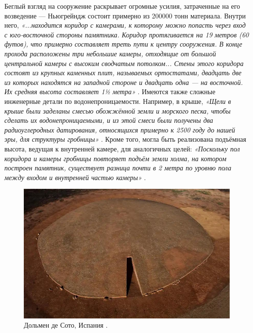 \documentclass[10pt,twocolumn,letterpaper]{article}
\begin{document}
Беглый взгляд на сооружение раскрывает огромные усилия, затраченные на его возведение — Ньюгрейндж состоит примерно из 200000 тонн материала. Внутри него, \textit{«...находится коридор с камерами, к которому можно попасть через вход с юго-восточной стороны памятника. Коридор протягивается на 19 метров (60 футов), что примерно составляет треть пути к центру сооружения. В конце прохода расположены три небольшие камеры, отходящие от большой центральной камеры с высоким сводчатым потолком... Стены этого коридора состоят из крупных каменных плит, называемых ортостатами, двадцать две из которых находятся на западной стороне и двадцать одна — на восточной. Их средняя высота составляет 1½ метра»} \cite{70}. Имеются также сложные инженерные детали по водонепроницаемости. Например, в крыше, \textit{«Щели в крыше были заделаны смесью обожжённой земли и морского песка, чтобы сделать их водонепроницаемыми, и из этой смеси были получены два радиоуглеродных датирования, относящихся примерно к 2500 году до нашей эры, для структуры гробницы»} \cite{71}. Кроме того, могла быть реализована подъёмная высота, ведущая к внутренней камере, для аналогичных целей: \textit{«Поскольку пол коридора и камеры гробницы повторяет подъём земли холма, на котором построен памятник, существует разница почти в 2 метра по уровню пола между входом и внутренней частью камеры»} \cite{71}.

\begin{figure}[b]
\begin{center}
   \includegraphics[width=1\linewidth]{dolmen.jpg}
\end{center}
   \caption{Дольмен де Сото, Испания \cite{53}.}
\label{fig:9}
\label{fig:onecol}
\end{figure}
\end{document}
